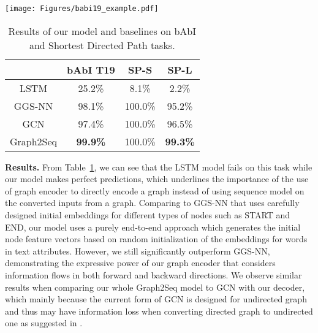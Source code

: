 \documentclass{article} \usepackage{iclr2019_conference,times}
\begin{document}
\begin{table}[t!]
\begin{minipage}[t]{0.48\linewidth}
    \vspace{0pt}
    \centering\texttt{[image: Figures/babi19\_example.pdf]}
    \label{fig:babi_19_example}
  \end{minipage}
    \begin{minipage}[t]{0.5\linewidth}
     \vspace{0pt}
    \centering
    \small
    \begin{tabular}{cc|cc}
    & bAbI T19 & SP-S & SP-L \\
\hline
    LSTM & 25.2\% & 8.1\% & 2.2\% \\
    GGS-NN & 98.1\% & 100.0\% & 95.2\% \\
    GCN & 97.4\% & 100.0\% & 96.5\%\\
    Graph2Seq & \textbf{99.9\%} & 100.0\% & \textbf{99.3\%} \\
    \hline
\end{tabular}
    \caption{Results of our model and baselines on bAbI and Shortest Directed Path tasks.}
    \label{tab:babi_exp}
  \end{minipage}\vspace{-.5cm}
\end{table}


\textbf{Results.} From Table~\ref{tab:babi_exp},
we can see that the LSTM model fails on this task while our model makes perfect predictions, which underlines the importance of the use of graph encoder to directly encode a graph instead of using sequence model on the converted inputs from a graph. Comparing to GGS-NN that uses carefully designed initial embeddings for different types of nodes such as START and END, our model uses a purely end-to-end approach which generates the initial node feature vectors based on random initialization of the embeddings for words in text attributes. However, we still significantly outperform GGS-NN, demonstrating the expressive power of our graph encoder that considers information flows in both forward and backward directions. We observe similar results when comparing our whole Graph2Seq model to GCN with our decoder, which mainly because the current form of GCN \citep{kipf2016semi} is designed for undirected graph and thus may have information loss when converting directed graph to undirected one as suggested in \citep{kipf2016semi}. 
\end{document}
